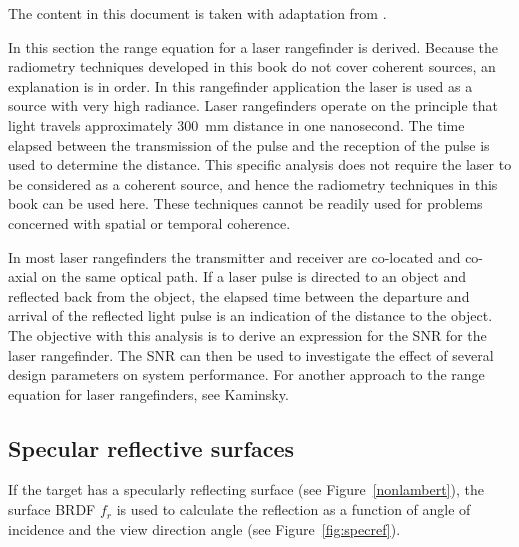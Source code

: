 
The content in this document is taken with adaptation from \cite{Willers2013}.


\noindent
In this section the range equation for a laser rangefinder is derived. Because the radiometry techniques developed in this book do not cover coherent sources, an explanation is in order. In this rangefinder application  the laser is used as a source with very high radiance. Laser rangefinders operate on the principle that light travels approximately 300~mm distance in one nanosecond. The time elapsed between the transmission of the pulse and the reception of the pulse is used to determine the distance. This specific analysis does not require the laser to be considered as a coherent source, and hence the radiometry techniques in this book can be used here. These techniques cannot be readily used for problems concerned with spatial or temporal coherence.

In most laser rangefinders the transmitter and receiver are co-located and co-axial on the same optical path. If a laser pulse
is directed to an object and reflected back from the object, the elapsed time between the departure and arrival of the reflected light pulse is an indication of the distance to the object. The objective with this analysis is to derive an expression for the SNR for the laser rangefinder. The  SNR can then be used to investigate the effect of several design parameters on system performance. For another approach to the range equation for laser rangefinders, see Kaminsky.\cite{Kaminski1980}


\subsection{Specular reflective surfaces}
\label{rfdetectpaint}
\noindent
{}If the target has a specularly reflecting surface (see Figure~\ref{nonlambert}), the surface BRDF $f_r$ is used to calculate the reflection as a function of angle of incidence and the view direction angle (see Figure~\ref{fig:specref}).

